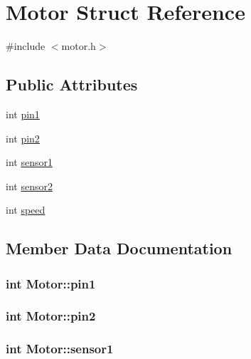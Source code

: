 \hypertarget{structMotor}{}\section{Motor Struct Reference}
\label{structMotor}


{\ttfamily \#include $<$motor.\+h$>$}

\subsection*{Public Attributes}
\begin{DoxyCompactItemize}
\item 
int \hyperlink{structMotor_ac23c99f9506b6694fd6db3be79bb35f4}{pin1}
\item 
int \hyperlink{structMotor_a36f1ad6fe616a79ad5dca2a63f7165ff}{pin2}
\item 
int \hyperlink{structMotor_ad73bc7411e788add9b17e24c242f7eb3}{sensor1}
\item 
int \hyperlink{structMotor_af73c223c8ca63799035f3f544fa52dae}{sensor2}
\item 
int \hyperlink{structMotor_a68b835dd35395fbab7b32eb0bbc12283}{speed}
\end{DoxyCompactItemize}


\subsection{Member Data Documentation}
\subsubsection[{\texorpdfstring{pin1}{pin1}}]{\setlength{\rightskip}{0pt plus 5cm}int Motor\+::pin1}\hypertarget{structMotor_ac23c99f9506b6694fd6db3be79bb35f4}{}\label{structMotor_ac23c99f9506b6694fd6db3be79bb35f4}
\subsubsection[{\texorpdfstring{pin2}{pin2}}]{\setlength{\rightskip}{0pt plus 5cm}int Motor\+::pin2}\hypertarget{structMotor_a36f1ad6fe616a79ad5dca2a63f7165ff}{}\label{structMotor_a36f1ad6fe616a79ad5dca2a63f7165ff}
\subsubsection[{\texorpdfstring{sensor1}{sensor1}}]{\setlength{\rightskip}{0pt plus 5cm}int Motor\+::sensor1}\hypertarget{structMotor_ad73bc7411e788add9b17e24c242f7eb3}{}\label{structMotor_ad73bc7411e788add9b17e24c242f7eb3}
